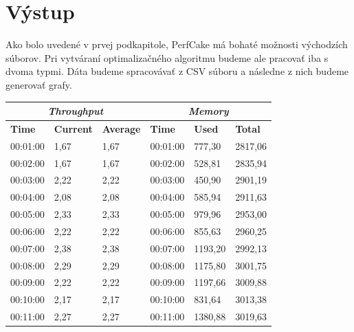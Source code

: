 \section{Výstup}

Ako bolo uvedené v prvej podkapitole, PerfCake má bohaté možnosti východzích súborov. Pri vytváraní optimalizačného algoritmu budeme ale pracovať iba s dvoma typmi. Dáta budeme spracovávať z CSV súboru a následne z nich budeme generovať grafy. 

\begin{table}[!htb]
\centering
\begin{tabular}{|l|l|l|l|l|l|}
\hline
\multicolumn{3}{|c|}{\textit{\textbf{Throughput}}}  & \multicolumn{3}{c|}{\textit{\textbf{Memory}}}  \\ \hline
\textbf{Time} & \textbf{Current} & \textbf{Average} & \textbf{Time} & \textbf{Used} & \textbf{Total} \\ \hline
00:01:00      & 1,67             & 1,67             & 00:01:00      & 777,30        & 2817,06        \\ \hline
00:02:00      & 1,67             & 1,67             & 00:02:00      & 528,81        & 2835,94        \\ \hline
00:03:00      & 2,22             & 2,22             & 00:03:00      & 450,90        & 2901,19        \\ \hline
00:04:00      & 2,08             & 2,08             & 00:04:00      & 585,94        & 2911,63        \\ \hline
00:05:00      & 2,33             & 2,33             & 00:05:00      & 979,96        & 2953,00        \\ \hline
00:06:00      & 2,22             & 2,22             & 00:06:00      & 855,63        & 2960,25        \\ \hline
00:07:00      & 2,38             & 2,38             & 00:07:00      & 1193,20       & 2992,13        \\ \hline
00:08:00      & 2,29             & 2,29             & 00:08:00      & 1175,80       & 3001,75        \\ \hline
00:09:00      & 2,22             & 2,22             & 00:09:00      & 1197,66       & 3009,88        \\ \hline
00:10:00      & 2,17             & 2,17             & 00:10:00      & 831,64        & 3013,38        \\ \hline
00:11:00      & 2,27             & 2,27             & 00:11:00      & 1380,88       & 3019,63        \\ \hline

\end{tabular}
\end{table}
